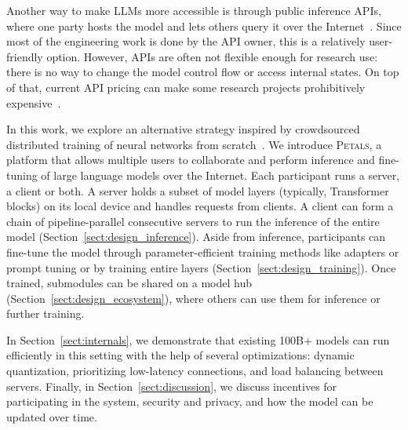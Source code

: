Another way to make LLMs more accessible is through public inference APIs, where one party hosts the model and lets others query it over the Internet~\cite{openai-api,jurrasic,forefront}. Since most of the engineering work is done by the API owner, this is a relatively user-friendly option.
However, APIs are often not flexible enough for research use: there is no way to change the model control flow or access internal states. On top of that, current API pricing can make some research projects prohibitively expensive~\cite{tfew}.

In this work, we explore an alternative strategy inspired by crowdsourced distributed training of neural networks from scratch~\cite{hivemind_dmoe}. We introduce \textsc{Petals}, a platform that allows multiple users to collaborate and perform inference and fine-tuning of large language models over the Internet.
Each participant runs a server, a client or both. A server holds a subset of model layers (typically, Transformer blocks) on its local device and handles requests from clients.
A client can form a chain of pipeline-parallel consecutive servers to run the inference of the entire model (Section~\ref{sect:design_inference}).
Aside from inference, participants can fine-tune the model through parameter-efficient training methods like adapters \cite{houlsby2019parameter} or prompt tuning \cite{ptune-lester} or by training entire layers (Section~\ref{sect:design_training}). Once trained, submodules can be shared on a model hub (Section~\ref{sect:design_ecosystem}), where others can use them for inference or further training.

In Section~\ref{sect:internals}, we demonstrate that existing 100B+ models can run efficiently in this setting with the help of several optimizations: dynamic quantization, prioritizing low-latency connections, and load balancing between servers. Finally, in Section~\ref{sect:discussion}, we discuss incentives for participating in the system, security and privacy, and how the model can be updated over time.

